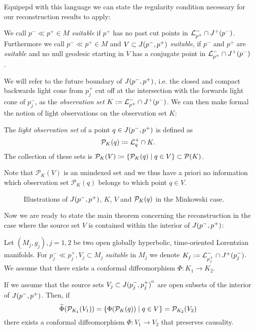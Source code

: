 Equipepd with this language we can state the regularity condition necessary for our reconstruction results to apply:
\begin{definition}[Suitable]
    We call $p^-\ll p^+\in M$  \emph{suitable} if $p^+$ has no past cut points in ${\mathcal{L}}^-_{p^+}\cap J^+(p^-)$. Furthermore we call $p^-\ll p^+\in M$ and $V\subset J(p^-,p^+)$ \emph{suitable}, if $p^-$ and $p^+$ are \emph{suitable} and no null geodesic starting in $V$ has a conjugate point in ${\mathcal{L}}^-_{p^+}\cap J^+(p^-)$.
\end{definition}
We will refer to the future boundary of $J(p^-,p^+)$, i.e. the closed and compact backwards light cone from $p_j^+$ cut off at the intersection with the forwards light cone of $p_j^-$, as the \emph{observation set} $K:={\mathcal{L}}^-_{p^+}\cap J^+(p^-)$. We can then make formal the notion of light observations on the observation set $K$:
\begin{definition}
    The \emph{light observation set} of a point $q\in J(p^-,p^+)$ is defined as
    \[
    {\mathcal{P}}_K(q) \coloneqq {\mathcal{L}}^+_q \cap K.
    \]
    The collection of these sets is ${\mathcal{P}}_K(V)\coloneqq\{\mathcal{P}_K(q)\mid q\in V\}\subset {\mathcal{P}}(K)$.
\end{definition}
Note that $\mathcal{P}_K(V)$ is an unindexed set and we thus have a priori no information which observation set $\mathcal{P}_K(q)$ belongs to which point $q\in V$.

\begin{figure}\label{fig:intro}
    \centering
    \hspace*{10pt}
    \caption{Illustrations of $J(p^-,p^+)$, $K$, $V$ and ${\mathcal{P}}_K(q)$ in the Minkowski case.}
\end{figure}

Now we are ready to state the main theorem concerning the reconstruction in the case where the source set $V$ is contained within the interior of $J(p^-,p^+)$:
\begin{theorem}\label{thm:intreconstr}
    Let $(M_j,g_j), j=1,2$ be two open globally hyperbolic, time-oriented Lorentzian manifolds. For $p_j^-\ll p_j^+, V_j\subset M_j$ \emph{suitable} in $M_j$ we denote $K_j := {\mathcal{L}}^-_{p_j^+} \cap J^+(p_j^-)$. We assume that there exists a conformal diffeomorphism $\Phi:K_1\to K_2$. 
    
    If we assume that the source sets $V_j\subset{\kern0ptJ(p_j^-,p_j^+)}^{\mathrm{o}}$ are open subsets of the interior of $J(p^-,p^+)$. 
    Then, if 
    \[
    \widetilde{\Phi}({\mathcal{P}}_{K_1}(V_1)) = \{\Phi({\mathcal{P}}_K(q))\mid q \in V\} = {\mathcal{P}}_{K_2}(V_2)
    \]
    there exists a conformal diffeomorphism $\Phi:V_1\to V_2$ that preserves causality.
\end{theorem}


